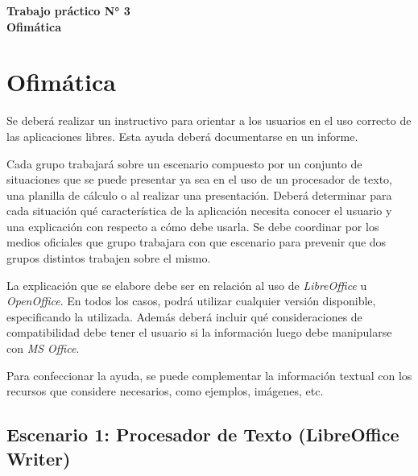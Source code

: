 \documentclass[12pt]{article}
\def\maketitle{

\makeatletter
{\color{bl} \centering \huge \sc \textbf{
Trabajo práctico N° 3\\
\large \vspace*{-8pt} \color{black} Ofimática
\vspace*{8pt} }\par}
\makeatother

\makeatletter


}
\begin{document}
\thispagestyle{empty}
\maketitle
\setlength{\parindent}{0pt}

\section*{Ofimática}

Se deberá realizar un instructivo para orientar a los usuarios en el uso
correcto de las aplicaciones libres. Esta ayuda deberá documentarse en un
informe.

Cada grupo trabajará sobre un escenario compuesto por un conjunto de
situaciones que se puede presentar ya sea en el uso de un procesador de texto,
una planilla de cálculo o al realizar una presentación. Deberá determinar para
cada situación qué característica de la aplicación necesita conocer el usuario
y una explicación con respecto a cómo debe usarla. Se debe coordinar por los
medios oficiales que grupo trabajara con que escenario para prevenir que dos
grupos distintos trabajen sobre el mismo.

La explicación que se elabore debe ser en relación al uso de
\emph{LibreOffice} u \emph{OpenOffice}. En todos los casos, podrá utilizar
cualquier versión disponible, especificando la utilizada. Además deberá
incluir qué consideraciones de compatibilidad debe tener el usuario si la
información luego debe manipularse con \emph{MS Office}.

Para confeccionar la ayuda, se puede complementar la información textual con
los recursos que considere necesarios, como ejemplos, imágenes, etc.

\subsection*{Escenario 1: Procesador de Texto (LibreOffice Writer)}
\end{document}
